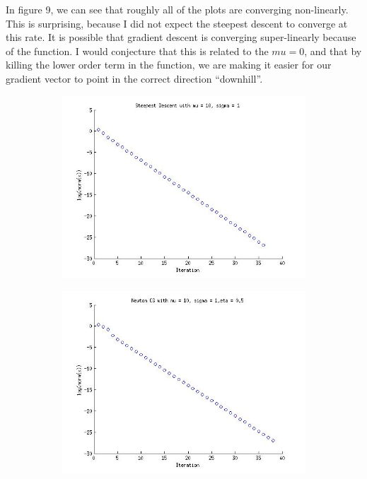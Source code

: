 \documentclass{article}
\begin{document}
In figure 9, we can see that roughly all of the plots are converging
non-linearly. This is surprising, because I did not expect the steepest
descent to converge at this rate. It is possible that gradient descent
is converging super-linearly because of the function. I would conjecture
that 
this is related to the $mu=0$, and that by killing the lower order term
in the function, we are making it easier for our gradient vector to
point in the correct direction ``downhill''.

\begin{figure}[!htb]
        \centering
        \begin{subfigure}[bh]{0.45\textwidth}
                \includegraphics[width=\textwidth]{figs/P3SDmu10sig1.jpg}
        \end{subfigure}%
        \begin{subfigure}[bh]{0.45\textwidth}
                \includegraphics[width=\textwidth]{figs/P3NCGmu10sig1eta1.jpg}

\end{subfigure}
\end{figure}
\end{document}
